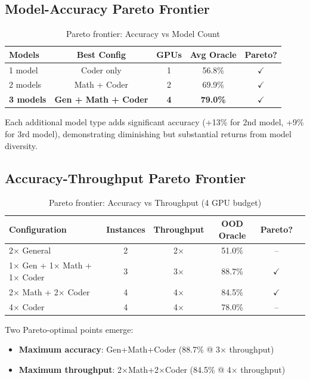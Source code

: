 \documentclass[11pt,a4paper]{article}
\begin{document}
\subsection{Model-Accuracy Pareto Frontier}

\begin{table}[h]
\centering
\caption{Pareto frontier: Accuracy vs Model Count}
\label{tab:pareto_models}
\begin{tabular}{lcccc}
\toprule
\textbf{Models} & \textbf{Best Config} & \textbf{GPUs} & \textbf{Avg Oracle} & \textbf{Pareto?} \\
\midrule
1 model & Coder only & 1 & 56.8\% & $\checkmark$ \\
2 models & Math + Coder & 2 & 69.9\% & $\checkmark$ \\
\textbf{3 models} & \textbf{Gen + Math + Coder} & \textbf{4} & \textbf{79.0\%} & $\checkmark$ \\
\bottomrule
\end{tabular}
\end{table}

Each additional model type adds significant accuracy (+13\% for 2nd model, +9\% for 3rd model), demonstrating diminishing but substantial returns from model diversity.

\subsection{Accuracy-Throughput Pareto Frontier}

\begin{table}[h]
\centering
\caption{Pareto frontier: Accuracy vs Throughput (4 GPU budget)}
\label{tab:pareto_throughput}
\begin{tabular}{lccccc}
\toprule
\textbf{Configuration} & \textbf{Instances} & \textbf{Throughput} & \textbf{OOD Oracle} & \textbf{Pareto?} \\
\midrule
2$\times$ General & 2 & 2$\times$ & 51.0\% & -- \\
1$\times$ Gen + 1$\times$ Math + 1$\times$ Coder & 3 & 3$\times$ & 88.7\% & $\checkmark$ \\
2$\times$ Math + 2$\times$ Coder & 4 & 4$\times$ & 84.5\% & $\checkmark$ \\
4$\times$ Coder & 4 & 4$\times$ & 78.0\% & -- \\
\bottomrule
\end{tabular}
\end{table}

Two Pareto-optimal points emerge:
\begin{itemize}
    \item \textbf{Maximum accuracy}: Gen+Math+Coder (88.7\% @ 3$\times$ throughput)
    \item \textbf{Maximum throughput}: 2$\times$Math+2$\times$Coder (84.5\% @ 4$\times$ throughput)
\end{itemize}
\end{document}
